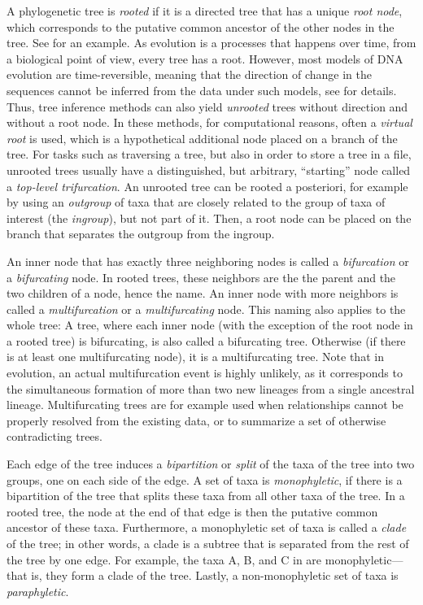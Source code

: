 A phylogenetic tree is \emph{rooted}
if it is a directed tree that has a unique \emph{root node},
which corresponds to the putative common ancestor of the other nodes in the tree.
See  for an example.
As evolution is a processes that happens over time,
from a biological point of view, every tree has a root.
However, most models of DNA evolution are time-reversible,
meaning that the direction of change in the sequences cannot be inferred from the data under such models,
see  for details.
Thus, tree inference methods can also yield \emph{unrooted} trees without direction and without a root node.
In these methods, for computational reasons, often a \emph{virtual root} is used,
which is a hypothetical additional node placed on a branch of the tree.
For tasks such as traversing a tree, but also in order to store a tree in a file,
unrooted trees usually have a distinguished, but arbitrary, ``starting'' node called a \emph{top-level trifurcation}.
An unrooted tree can be rooted a posteriori, for example by using an \emph{outgroup} of taxa
that are closely related to the group of taxa of interest (the \emph{ingroup}), but not part of it.
Then, a root node can be placed on the branch that separates the outgroup from the ingroup.

An inner node that has exactly three neighboring nodes is called a \emph{bifurcation} or a \emph{bifurcating} node.
In rooted trees, these neighbors are the the parent and the two children of a node, hence the name.
An inner node with more neighbors is called a \emph{multifurcation} or a \emph{multifurcating} node.
This naming also applies to the whole tree:
A tree, where each inner node (with the exception of the root node in a rooted tree) is bifurcating,
is also called a bifurcating tree.
Otherwise (if there is at least one multifurcating node), it is a multifurcating tree.
Note that in evolution, an actual multifurcation event is highly unlikely,
as it corresponds to the simultaneous formation of more than two new lineages from a single ancestral lineage.
Multifurcating trees are for example used when relationships cannot be properly resolved from the existing data,
or to summarize a set of otherwise contradicting trees.

Each edge of the tree induces a \emph{bipartition} or \emph{split} of the taxa of the tree into two groups,
one on each side of the edge.
A set of taxa is \emph{monophyletic},
if there is a bipartition of the tree that splits these taxa from all other taxa of the tree.
In a rooted tree, the node at the end of that edge is then the putative common ancestor of these taxa.
Furthermore, a monophyletic set of taxa is called a \emph{clade} of the tree;
in other words, a clade is a subtree that is separated from the rest of the tree by one edge.
For example, the taxa {\sffamily A}, {\sffamily B}, and {\sffamily C} in  are monophyletic---%
that is, they form a clade of the tree.
Lastly, a non-monophyletic set of taxa is \emph{paraphyletic}.

